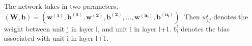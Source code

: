 The network takes in two parameters, $ (\mathbf{W, b}) = (\mathbf{w^{(1)}, b^{(1)}}, 
\mathbf{w^{(2)}, b^{(2)}}, \dots , 
\mathbf{w^{(n_l)}, b^{(n_l)}}) $. Then $ w_{ij}^l $ denotes the weight between unit j in layer l, and unit i in layer l+1. $ b_i^l $ denotes the bias associated with unit i in layer l+1.